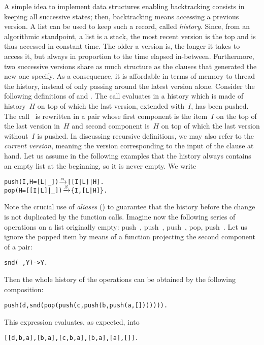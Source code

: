 A simple idea to implement data structures enabling backtracking
consists in keeping all successive states; then, backtracking means
accessing a previous version. A list can be used to keep such a
record, called \emph{history}. Since, from an algorithmic standpoint,
a list is a stack, the most recent version is the top and is thus
accessed in constant time. The older a version is, the longer it takes
to access it, but always in proportion to the time elapsed
in\hyp{}between. Furthermore, two successive versions share as much
structure as the clauses that generated the new one specify. As a
consequence, it is affordable in terms of memory to thread the
history, instead of only passing around the latest version
alone. Consider the following definitions of  and
. The call  evaluates in a
history which is made of history~\(H\) on top of which the last
version, extended with~\(I\), has been pushed. The
call~ is rewritten in a pair whose first component
is the item~\(I\) on the top of the last version in~\(H\) and second
component is~\(H\) on top of which the last version without~\(I\) is
pushed. In discussing recursive definitions, we may also refer to the
\emph{current version}, meaning the version corresponding to the input
of the clause at hand. Let us assume in the following examples that
the history always contains an empty list at the beginning, so it is
never empty. We write
\begin{alltt}
push(I,H=[L|_])  \(\smashedrightarrow{\alpha}\) [[I|L]|H].
pop(H=[[I|L]|_]) \(\smashedrightarrow{\beta}\) \{I,[L|H]\}.
\end{alltt}
Note the crucial use of \emph{aliases} () to guarantee that
the history before the change is not duplicated by the function
calls. Imagine now the following series of operations on a list
originally empty: push~, push~,
push~, pop, push~. Let us ignore the popped item
by means of a function projecting the second component of a pair:
\begin{alltt}
snd({_,Y}) -> Y.
\end{alltt}
Then the whole history of the operations can be obtained by the
following composition:
\begin{center}
\texttt{push(d,snd(pop(push(c,push(b,push(a,[])))))).}
\end{center}
This expression evaluates, as expected, into
\begin{center}
\texttt{[[d,b,a],[b,a],[c,b,a],[b,a],[a],[]].}
\end{center}
